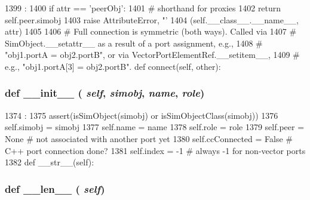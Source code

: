 \begin{DoxyCode}
1399                                :
1400         if attr == 'peerObj':
1401             # shorthand for proxies
1402             return self.peer.simobj
1403         raise AttributeError, "'%
1404               (self.__class__.__name__, attr)
1405 
1406     # Full connection is symmetric (both ways).  Called via
1407     # SimObject.__setattr__ as a result of a port assignment, e.g.,
1408     # "obj1.portA = obj2.portB", or via VectorPortElementRef.__setitem__,
1409     # e.g., "obj1.portA[3] = obj2.portB".
    def connect(self, other):
\end{DoxyCode}
\hypertarget{classm5_1_1params_1_1PortRef_ac775ee34451fdfa742b318538164070e}{
\subsubsection[{\_\-\_\-init\_\-\_\-}]{\setlength{\rightskip}{0pt plus 5cm}def \_\-\_\-init\_\-\_\- ( {\em self}, \/   {\em simobj}, \/   {\em name}, \/   {\em role})}}
\label{classm5_1_1params_1_1PortRef_ac775ee34451fdfa742b318538164070e}



\begin{DoxyCode}
1374                                           :
1375         assert(isSimObject(simobj) or isSimObjectClass(simobj))
1376         self.simobj = simobj
1377         self.name = name
1378         self.role = role
1379         self.peer = None   # not associated with another port yet
1380         self.ccConnected = False # C++ port connection done?
1381         self.index = -1  # always -1 for non-vector ports
1382 
    def __str__(self):
\end{DoxyCode}
\hypertarget{classm5_1_1params_1_1PortRef_af6412d48d9a71eac81e3195b52455aaa}{
\subsubsection[{\_\-\_\-len\_\-\_\-}]{\setlength{\rightskip}{0pt plus 5cm}def \_\-\_\-len\_\-\_\- ( {\em self})}}
\label{classm5_1_1params_1_1PortRef_af6412d48d9a71eac81e3195b52455aaa}



